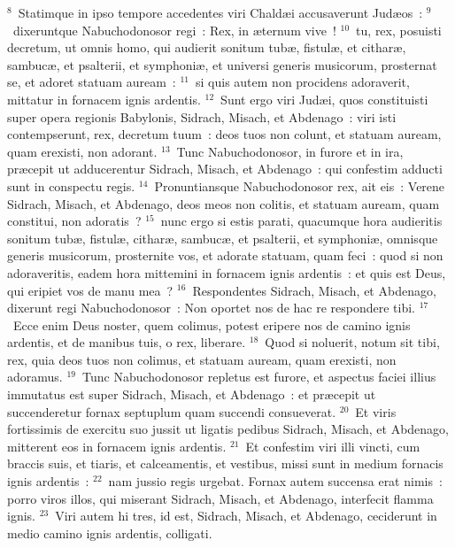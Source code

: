 ${}^{8}$~Statimque in ipso tempore accedentes viri Chald\ae i accusaverunt Jud\ae os~:
${}^{9}$~dixeruntque Nabuchodonosor regi~: Rex, in \ae ternum vive~!
${}^{10}$~tu, rex, posuisti decretum, ut omnis homo, qui audierit sonitum tub\ae , fistul\ae , et cithar\ae , sambuc\ae , et psalterii, et symphoni\ae , et universi generis musicorum, prosternat se, et adoret statuam auream~:
${}^{11}$~si quis autem non procidens adoraverit, mittatur in fornacem ignis ardentis.
${}^{12}$~Sunt ergo viri Jud\ae i, quos constituisti super opera regionis Babylonis, Sidrach, Misach, et Abdenago~: viri isti contempserunt, rex, decretum tuum~: deos tuos non colunt, et statuam auream, quam erexisti, non adorant.
${}^{13}$~Tunc Nabuchodonosor, in furore et in ira, pr\ae cepit ut adducerentur Sidrach, Misach, et Abdenago~: qui confestim adducti sunt in conspectu regis.
${}^{14}$~Pronuntiansque Nabuchodonosor rex, ait eis~: Verene Sidrach, Misach, et Abdenago, deos meos non colitis, et statuam auream, quam constitui, non adoratis~?
${}^{15}$~nunc ergo si estis parati, quacumque hora audieritis sonitum tub\ae , fistul\ae , cithar\ae , sambuc\ae , et psalterii, et symphoni\ae , omnisque generis musicorum, prosternite vos, et adorate statuam, quam feci~: quod si non adoraveritis, eadem hora mittemini in fornacem ignis ardentis~: et quis est Deus, qui eripiet vos de manu mea~?
${}^{16}$~Respondentes Sidrach, Misach, et Abdenago, dixerunt regi Nabuchodonosor~: Non oportet nos de hac re respondere tibi.
${}^{17}$~Ecce enim Deus noster, quem colimus, potest eripere nos de camino ignis ardentis, et de manibus tuis, o rex, liberare.
${}^{18}$~Quod si noluerit, notum sit tibi, rex, quia deos tuos non colimus, et statuam auream, quam erexisti, non adoramus.
${}^{19}$~Tunc Nabuchodonosor repletus est furore, et aspectus faciei illius immutatus est super Sidrach, Misach, et Abdenago~: et pr\ae cepit ut succenderetur fornax septuplum quam succendi consueverat.
${}^{20}$~Et viris fortissimis de exercitu suo jussit ut ligatis pedibus Sidrach, Misach, et Abdenago, mitterent eos in fornacem ignis ardentis.
${}^{21}$~Et confestim viri illi vincti, cum braccis suis, et tiaris, et calceamentis, et vestibus, missi sunt in medium fornacis ignis ardentis~:
${}^{22}$~nam jussio regis urgebat. Fornax autem succensa erat nimis~: porro viros illos, qui miserant Sidrach, Misach, et Abdenago, interfecit flamma ignis.
${}^{23}$~Viri autem hi tres, id est, Sidrach, Misach, et Abdenago, ceciderunt in medio camino ignis ardentis, colligati.


